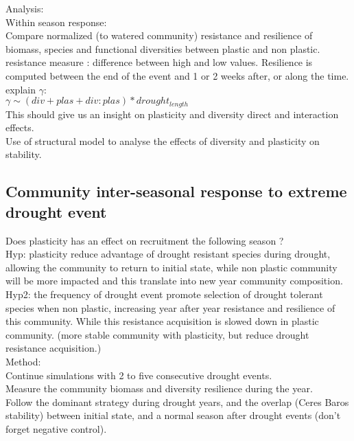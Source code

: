\documentclass[review]{elsarticle}
\begin{document}
Analysis:\\
Within season response:\\
Compare normalized (to watered community) resistance and resilience of biomass, species and functional diversities between plastic and non plastic.\\
resistance measure : difference between high and low values. Resilience is computed between the end of the event and 1 or 2 weeks after, or along the time.\\

explain $\gamma$:\\
$\gamma \sim (div + plas + div:plas) * drought_{length}$\\
This should give us an insight on plasticity and diversity direct and interaction effects.\\

Use of structural model to analyse the effects of diversity and plasticity on stability.


\subsection{Community inter-seasonal response to extreme drought event}

Does plasticity has an effect on recruitment the following season ?\\
Hyp: plasticity reduce advantage of drought resistant species during drought, allowing the community to return to initial state, while non plastic community will be more impacted and this translate into new year community composition.\\
Hyp2: the frequency of drought event promote selection of drought tolerant species when non plastic, increasing year after year resistance and resilience of this community. While this resistance acquisition is slowed down in plastic community.
(more stable community with plasticity, but reduce drought resistance acquisition.)\\

Method: \\
Continue simulations with 2 to five consecutive drought events.\\
Measure the community biomass and diversity resilience during the year.\\
Follow the dominant strategy during drought years, and the overlap (Ceres Baros stability) between initial state, and a normal season after drought events (don't forget negative control).
\end{document}
